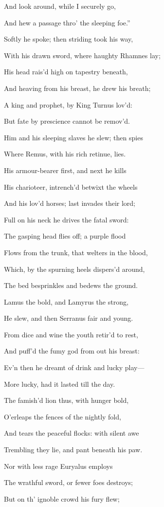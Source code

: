 And look around, while I securely go,

And hew a passage thro’ the sleeping foe.”

Softly he spoke; then striding took his way,

With his drawn sword, where haughty Rhamnes lay;

His head rais’d high on tapestry beneath,

And heaving from his breast, he drew his breath;

A king and prophet, by King Turnus lov’d:

But fate by prescience cannot be remov’d.

Him and his sleeping slaves he slew; then spies

Where Remus, with his rich retinue, lies.

His armour-bearer first, and next he kills

His charioteer, intrench’d betwixt the wheels

And his lov’d horses; last invades their lord;

Full on his neck he drives the fatal sword:

The gasping head flies off; a purple flood

Flows from the trunk, that welters in the blood,

Which, by the spurning heels dispers’d around,

The bed besprinkles and bedews the ground.

Lamus the bold, and Lamyrus the strong,

He slew, and then Serranus fair and young.

From dice and wine the youth retir’d to rest,

And puff’d the fumy god from out his breast:

Ev’n then he dreamt of drink and lucky play—

More lucky, had it lasted till the day.

The famish’d lion thus, with hunger bold,

O’erleaps the fences of the nightly fold,

And tears the peaceful flocks: with silent awe

Trembling they lie, and pant beneath his paw.

Nor with less rage Euryalus employs

The wrathful sword, or fewer foes destroys;

But on th’ ignoble crowd his fury flew;

